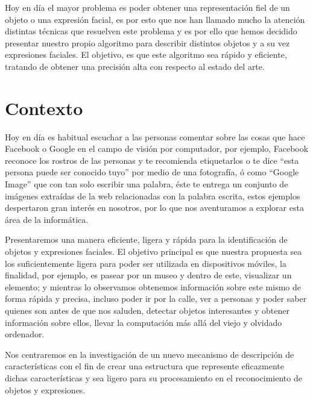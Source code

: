 Hoy en día el mayor problema es poder obtener una representación fiel de un objeto o una expresión facial, es por esto que nos han llamado mucho la atención distintas técnicas que resuelven este problema y es por ello que hemos decidido presentar nuestro propio algoritmo para describir distintos objetos y a su vez expresiones faciales. El objetivo, es que este algoritmo sea rápido y eficiente, tratando de obtener una precisión alta con respecto al estado del arte.

\section{Contexto}\label{sub:Contexto}

Hoy en día es habitual escuchar a las personas comentar sobre las cosas que hace Facebook o Google en el campo de visión por computador, por ejemplo, Facebook reconoce los rostros de las personas y te recomienda etiquetarlos o te dice ``esta persona puede ser conocido tuyo'' por medio de una fotografía, ó como ``Google Image'' que con tan solo escribir una palabra, éste te entrega un conjunto de imágenes extraídas de la web relacionadas con la palabra escrita, estos ejemplos despertaron gran interés en nosotros, por lo que nos aventuramos a explorar esta área de la informática.

Presentaremos una manera eficiente, ligera y rápida para la identificación de objetos y expresiones faciales. El objetivo principal es que nuestra propuesta sea los suficientemente ligera para poder ser utilizada en dispositivos móviles, la finalidad, por ejemplo, es pasear por un museo y dentro de este, visualizar un elemento; y mientras lo observamos obtenemos información sobre este mismo de forma rápida y precisa, incluso poder ir por la calle, ver a personas y poder saber quienes son antes de que nos saluden, detectar objetos interesantes y obtener información sobre ellos, llevar la computación más allá del viejo y olvidado ordenador.

Nos centraremos en la investigación de un nuevo mecanismo de descripción de características con el fin de crear una estructura que represente eficazmente dichas características y sea ligero para su procesamiento en el reconocimiento de objetos y expresiones.

